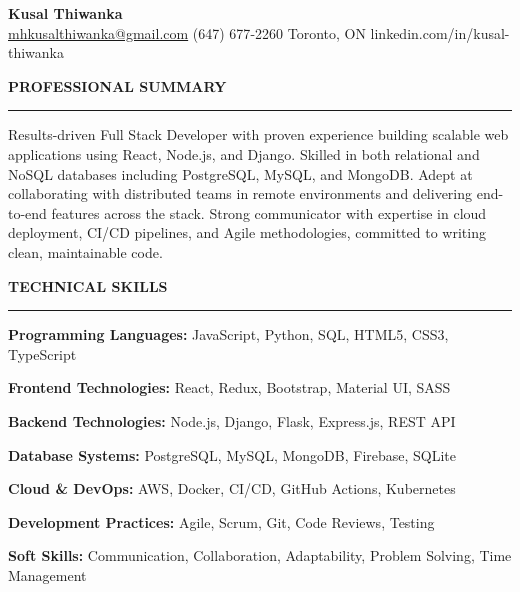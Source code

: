 \documentclass[10pt,letterpaper]{article}
\begin{document}
\begin{center}
{\LARGE\textbf{Kusal Thiwanka}}\\[3pt]
\href{mailto:mhkusalthiwanka@gmail.com}{mhkusalthiwanka@gmail.com}\hspace{2em}%
(647) 677{-}2260\hspace{2em}%
Toronto, ON\hspace{2em}
linkedin.com/in/kusal-thiwanka
\end{center}

\vspace{6pt}

\textbf{PROFESSIONAL SUMMARY}\\[-8pt]
\noindent\rule{\textwidth}{1pt}

\vspace{-2pt}

Results-driven Full Stack Developer with proven experience building scalable web applications using React, Node.js, and Django. Skilled in both relational and NoSQL databases including PostgreSQL, MySQL, and MongoDB. Adept at collaborating with distributed teams in remote environments and delivering end-to-end features across the stack. Strong communicator with expertise in cloud deployment, CI/CD pipelines, and Agile methodologies, committed to writing clean, maintainable code.

\vspace{8pt}

\textbf{TECHNICAL SKILLS}\\[-8pt]
\noindent\rule{\textwidth}{1pt}

\vspace{-2pt}

\textbf{Programming Languages:} JavaScript, Python, SQL, HTML5, CSS3, TypeScript

\textbf{Frontend Technologies:} React, Redux, Bootstrap, Material UI, SASS

\textbf{Backend Technologies:} Node.js, Django, Flask, Express.js, REST API

\textbf{Database Systems:} PostgreSQL, MySQL, MongoDB, Firebase, SQLite

\textbf{Cloud \& DevOps:} AWS, Docker, CI/CD, GitHub Actions, Kubernetes

\textbf{Development Practices:} Agile, Scrum, Git, Code Reviews, Testing

\textbf{Soft Skills:} Communication, Collaboration, Adaptability, Problem Solving, Time Management

\vspace{8pt}
\end{document}
